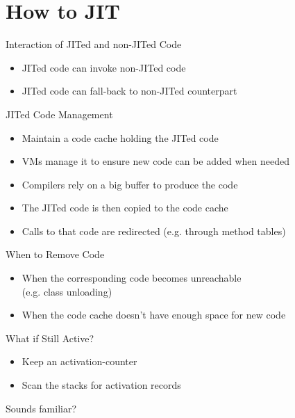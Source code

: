 \documentclass[
14pt,
aspectratio=169,
usenames,
dvipsnames,
x11names]{beamer}
\begin{document}
\section{How to JIT}

\begin{frame}{Interaction of JITed and non-JITed Code}
  \begin{itemize}  \setlength{\itemsep}{\fill}
  \item JITed code can invoke non-JITed code
  \item JITed code can fall-back to non-JITed counterpart
  \end{itemize}
\end{frame}

\begin{frame}{JITed Code Management}
  \begin{itemize}  \setlength{\itemsep}{\fill}
  \item Maintain a \alert{code cache} holding the JITed code
  \item VMs manage it to ensure new code can be added when needed
  \item Compilers rely on a big buffer to produce the code
  \item The JITed code is then copied to the code cache
  \item Calls to that code are redirected (e.g. through method tables)
  \end{itemize}
\end{frame}

\begin{frame}{When to Remove Code}
  \begin{itemize}  \setlength{\itemsep}{\fill}
  \item When the corresponding code \alert{becomes unreachable}\\
    (e.g. class unloading)
  \item When the code cache doesn't have enough \alert{space for new code}
  \end{itemize}
\end{frame}

\begin{frame}{What if Still Active?}
  \begin{itemize}  \setlength{\itemsep}{\fill}
  \item Keep an \alert{activation-counter}
  \item \alert{Scan} the stacks for activation records
  \end{itemize}
  \pause
  \vfill
  \centering
  Sounds familiar?
\end{frame}
\end{document}

